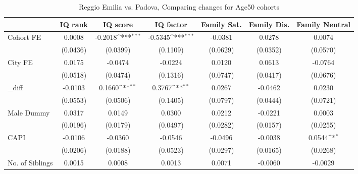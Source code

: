 \begin{table}[htbp]\centering
\def\sym#1{\ifmmode^{#1}\else\(^{#1}\)\fi}
\caption{Reggio Emilia vs. Padova, Comparing changes for Age50 cohorts}
\begin{tabular}{l*{6}{c}}
\toprule
            &\multicolumn{1}{c}{IQ rank}&\multicolumn{1}{c}{IQ score}&\multicolumn{1}{c}{IQ factor}&\multicolumn{1}{c}{Family Sat.}&\multicolumn{1}{c}{Family Dis.}&\multicolumn{1}{c}{Family Neutral}\\
\midrule
Cohort FE   &      0.0008         &     -0.2018\sym{***}&     -0.5345\sym{***}&     -0.0381         &      0.0278         &      0.0074         \\
            &    (0.0436)         &    (0.0399)         &    (0.1109)         &    (0.0629)         &    (0.0352)         &    (0.0570)         \\
\addlinespace
City FE     &      0.0175         &     -0.0474         &     -0.0224         &      0.0120         &      0.0613         &     -0.0764         \\
            &    (0.0518)         &    (0.0474)         &    (0.1316)         &    (0.0747)         &    (0.0417)         &    (0.0676)         \\
\addlinespace
\_diff       &     -0.0103         &      0.1660\sym{**} &      0.3767\sym{**} &      0.0267         &     -0.0462         &      0.0230         \\
            &    (0.0553)         &    (0.0506)         &    (0.1405)         &    (0.0797)         &    (0.0444)         &    (0.0721)         \\
\addlinespace
Male Dummy  &      0.0317         &      0.0149         &      0.0300         &      0.0212         &     -0.0221         &      0.0003         \\
            &    (0.0196)         &    (0.0179)         &    (0.0497)         &    (0.0282)         &    (0.0157)         &    (0.0255)         \\
\addlinespace
CAPI        &     -0.0106         &     -0.0360         &     -0.0546         &     -0.0496         &     -0.0038         &      0.0544\sym{*}  \\
            &    (0.0206)         &    (0.0188)         &    (0.0523)         &    (0.0297)         &    (0.0165)         &    (0.0268)         \\
\addlinespace
No. of Siblings&      0.0015         &      0.0008         &      0.0013         &      0.0071         &     -0.0060         &     -0.0029         \\

\end{tabular}
\end{table}
